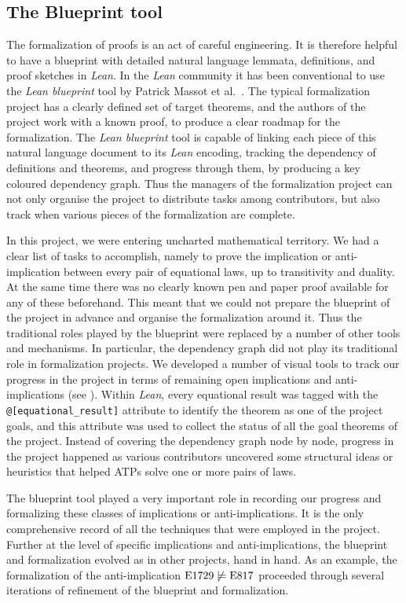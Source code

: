 \subsection{The Blueprint tool}

The formalization of proofs is an act of careful engineering. It is therefore helpful to have a blueprint with detailed natural language lemmata, definitions, and proof sketches in \emph{Lean}. In the \emph{Lean} community it has been conventional to use the \emph{Lean blueprint} tool by Patrick Massot et al.~\cite{leanblueprint}. The typical formalization project has a clearly defined set of target theorems, and the authors of the project work with a known proof, to produce a clear roadmap for the formalization. The \emph{Lean blueprint} tool is capable of linking each piece of this natural language document to its \emph{Lean} encoding, tracking the dependency of definitions and theorems, and progress through them, by producing a key coloured dependency graph. Thus the managers of the formalization project can not only organise the project to distribute tasks among contributors, but also track when various pieces of the formalization are complete.

In this project, we were entering uncharted mathematical territory. We had a clear list of tasks to accomplish, namely to prove the implication or anti-implication between every pair of equational laws, up to transitivity and duality. At the same time there was no clearly known pen and paper proof available for any of these beforehand. This meant that we could not prepare the blueprint of the project in advance and organise the formalization around it. Thus the traditional roles played by the blueprint were replaced by a number of other tools and mechanisms. In particular, the dependency graph did not play its traditional role in formalization projects. We developed a number of visual tools to track our progress in the project in terms of remaining open implications and anti-implications (see ). Within \emph{Lean}, every equational result was tagged with the \texttt{@[equational\_result]} attribute to identify the theorem as one of the project goals, and this attribute was used to collect the status of all the goal theorems of the project. Instead of covering the dependency graph node by node, progress in the project happened as various contributors uncovered some structural ideas or heuristics that helped ATPs solve one or more pairs of laws.

The blueprint tool played a very important role in recording our progress and formalizing these classes of implications or anti-implications. It is the only comprehensive record of all the techniques that were employed in the project. Further at the level of specific implications and anti-implications, the blueprint and formalization evolved as in other projects, hand in hand. As an example, the formalization of the anti-implication  $\mathrm{E}1729 \not\models \mathrm{E}817$ proceeded through several iterations of refinement of the blueprint and formalization.

